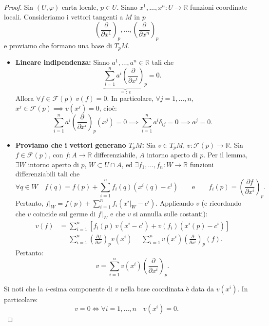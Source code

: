         \begin{proof}
        Sia $(U, \varphi)$ carta locale, $p \in U$. Siano $x^1, \dots, x^n : U \to \mathbb{R}$ funzioni coordinate locali. Consideriamo i vettori tangenti a $M$ in $p$
        \[
        \left( \frac{\partial}{\partial x^1} \right)_p, \dots, \left( \frac{\partial}{\partial x^n} \right)_p
        \]
        e proviamo che formano una base di $T_p M$.

        \begin{itemize}
        \item \textbf{Lineare indipendenza:} Siano $a^1, \dots, a^n \in \mathbb{R}$ tali che
        \[
        \underbrace{\sum_{i=1}^n a^i \left( \frac{\partial}{\partial x^i} \right)_p}_{=: \, v} = 0.
        \]
        Allora $\forall f \in \mathcal{F}(p) \; v(f) = 0$. In particolare, $\forall j = 1, \dots, n$, $x^j \in \mathcal{F}(p) \implies v(x^j) = 0$, cioè:
        \[
        \sum_{i=1}^n a^i \left( \frac{\partial}{\partial x^i} \right)_p (x^j) = 0 \implies \sum_{i=1}^n a^i \delta_{ij} = 0 \implies a^j = 0.
        \]

        \item \textbf{Proviamo che i vettori generano $T_p M$:} Sia $v \in T_p M$, $v : \mathcal{F}(p) \to \mathbb{R}$. Sia $f \in \mathcal{F}(p)$, con $f : A \to \mathbb{R}$ differenziabile, $A$ intorno aperto di $p$.
        Per il lemma, $\exists W$ intorno aperto di $p$, $W \subset U \cap A$, ed $\exists f_1, \dots, f_n : W \to \mathbb{R}$ funzioni differenziabili tali che
        \[
        \forall q \in W \quad f(q) = f(p) + \sum_{i=1}^n f_i(q) (x^i(q) - c^i) \qquad \text{e} \qquad f_i(p) = \left( \frac{\partial f}{\partial x^i} \right)_p.
        \]
        Pertanto, $f|_W = f(p) + \sum_{i=1}^n f_i (x^i|_W - c^i)$. Applicando $v$ (e ricordando che $v$ coincide sul germe di $f|_W$ e che $v$ si annulla sulle costanti):
        \begin{align*}
        v(f) &= \sum_{i=1}^n \left[ f_i(p) \, v(x^i - c^i) + v(f_i) (x^i(p) - c^i) \right] \\
        &= \sum_{i=1}^n \left( \frac{\partial f}{\partial x^i} \right)_p v(x^i) = \sum_{i=1}^n v(x^i) \left( \frac{\partial}{\partial x^i} \right)_p (f).
        \end{align*}
        Pertanto:
        \[
        v = \sum_{i=1}^n v(x^i) \left( \frac{\partial}{\partial x^i} \right)_p.
        \]
        \end{itemize}
        Si noti che la $i$-esima componente di $v$ nella base coordinata è data da $v(x^i)$. In particolare:
        \[
        v = 0 \iff \forall i = 1, \dots, n \quad v(x^i) = 0.
        \]
        \end{proof}


